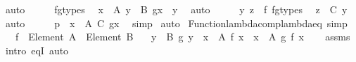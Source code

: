 \begin{isabellebody}
\ auto\isanewline
\ \ \isamarkupfalse%
\ \isamarkupfalse%
\ f{\isacharunderscore}{\kern0pt}g{\isacharunderscore}{\kern0pt}types\ \isamarkupfalse%
\ {\isachardoublequoteopen}x\ {\isacharcolon}{\kern0pt}\ A{\isachardoublequoteclose}\ {\isachardoublequoteopen}y\ {\isacharcolon}{\kern0pt}\ B{\isachardoublequoteclose}\ {\isachardoublequoteopen}g{\isacharbackquote}{\kern0pt}x\ {\isacharequal}{\kern0pt}\ y{\isachardoublequoteclose}\ \isamarkupfalse%
\ auto\isanewline
\ \ \isamarkupfalse%
\ \isamarkupfalse%
\ {\isacartoucheopen}{\isasymlangle}y{\isacharcomma}{\kern0pt}\ z{\isasymrangle}\ {\isasymin}\ f{\isacartoucheclose}\ f{\isacharunderscore}{\kern0pt}g{\isacharunderscore}{\kern0pt}types\ \isamarkupfalse%
\ {\isachardoublequoteopen}z\ {\isacharcolon}{\kern0pt}\ C\ y{\isachardoublequoteclose}\ \isamarkupfalse%
\ auto\isanewline
\ \ \isamarkupfalse%
\ \isamarkupfalse%
\ {\isachardoublequoteopen}p\ {\isacharcolon}{\kern0pt}\ {\isasymSum}x\ {\isacharcolon}{\kern0pt}\ A{\isachardot}{\kern0pt}\ {\isacharparenleft}{\kern0pt}C\ {\isacharparenleft}{\kern0pt}g{\isacharbackquote}{\kern0pt}x{\isacharparenright}{\kern0pt}{\isacharparenright}{\kern0pt}{\isachardoublequoteclose}\ \isamarkupfalse%
\ simp\isanewline
{}\isamarkupfalse%
\ auto%
\endisatagproof
{\isafoldproof}%
%
\isadelimproof
\isanewline
%
\endisadelimproof
\isanewline
{}\isamarkupfalse%
\ Function{\isacharunderscore}{\kern0pt}lambda{\isacharunderscore}{\kern0pt}comp{\isacharunderscore}{\kern0pt}lambda{\isacharunderscore}{\kern0pt}eq\ {\isacharbrackleft}{\kern0pt}simp{\isacharbrackright}{\kern0pt}{\isacharcolon}{\kern0pt}\isanewline
\ \ \ {\isachardoublequoteopen}f\ {\isacharcolon}{\kern0pt}\ Element\ A\ {\isasymRightarrow}\ Element\ B{\isachardoublequoteclose}\isanewline
\ \ \ {\isachardoublequoteopen}{\isacharparenleft}{\kern0pt}{\isasymlambda}y\ {\isasymin}\ B{\isachardot}{\kern0pt}\ g\ y{\isacharparenright}{\kern0pt}\ {\isasymcirc}\ {\isacharparenleft}{\kern0pt}{\isasymlambda}x\ {\isasymin}\ A{\isachardot}{\kern0pt}\ f\ x{\isacharparenright}{\kern0pt}\ {\isacharequal}{\kern0pt}\ {\isasymlambda}x\ {\isasymin}\ A{\isachardot}{\kern0pt}\ g\ {\isacharparenleft}{\kern0pt}f\ x{\isacharparenright}{\kern0pt}{\isachardoublequoteclose}\isanewline
%
\isadelimproof
\ \ %
\endisadelimproof
%
\isatagproof
{}\isamarkupfalse%
\ assms\ \isamarkupfalse%
\ {\isacharparenleft}{\kern0pt}intro\ eqI{\isacharparenright}{\kern0pt}\ auto%
\endisatagproof
{\isafoldproof}%
%
\isadelimproof
\isanewline
%
\endisadelimproof
\isanewline
%
\isadelimtheory
\isanewline
%
\endisadelimtheory
%
\isatagtheory
{}\isamarkupfalse%
%
\endisatagtheory
{\isafoldtheory}%
%
\isadelimtheory
%
\endisadelimtheory
%
\end{isabellebody}%
